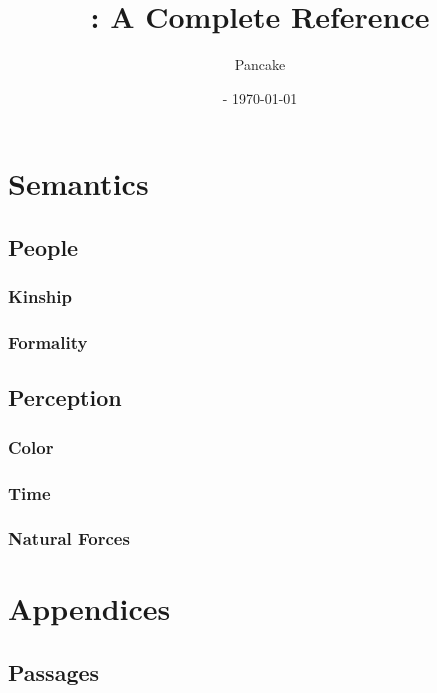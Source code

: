 \documentclass[openany, 12pt, b5paper, draft]{memoir}
\begin{document}
\title{\langname : A Complete Reference}
\author{Pancake}
\date{ - \today}
\frontmatter
\begin{titlingpage}
  \maketitle
\end{titlingpage}

\begin{KeepFromToc}
  \tableofcontents
\end{KeepFromToc}
\mainmatter





\part{Semantics}
\chapter{People}
\section{Kinship}
\section{Formality}
\chapter{Perception}
\section{Color}
\section{Time}
\section{Natural Forces}

\part{Appendices}
\appendix

\chapter{Passages}
\backmatter
\end{document}
